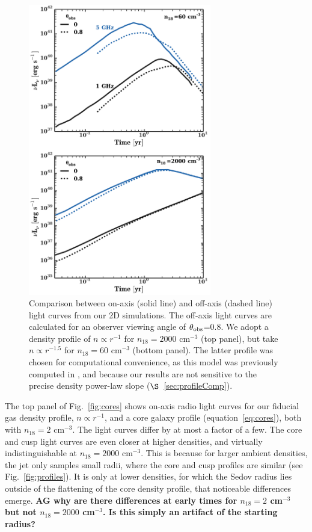 \documentclass[usenatbib,fleqn]{mnras}
\begin{document}
\begin{figure}
\includegraphics[width=8cm]{on_off.pdf}
\caption{\label{fig:onOff} Comparison between on-axis (solid line) and
  off-axis (dashed line) light curves from our 2D simulations.  The
  off-axis light curves are calculated for an observer viewing angle
  of $\theta_{\rm obs}$=0.8.  We adopt a density profile of $n\propto
  r^{-1}$ for $n_{18}=2000$ cm$^{-3}$ (top panel), but take $n\propto
  r^{-1.5}$ for $n_{18}=60$ cm$^{-3}$ (bottom panel).  The latter
  profile was chosen for computational convenience, as this model was
  previously computed in \citet{Mimica+2015}, and because our results
  are not sensitive to the precise density power-law slope
  ($\S$~\ref{sec:profileComp}).}
\end{figure}

\label{sec:profileComp}
The top panel of Fig.~\ref{fig:cores} shows on-axis radio light curves
for our fiducial gas density profile, $n\propto r^{-1}$, and a core
galaxy profile (equation~\ref{eq:cores}), both with $n_{18}=2$
cm$^{-3}$.  The light curves differ by at most a factor of a few. The
core and cusp light curves are even closer at higher densities, and
virtually indistinguishable at $n_{18}=2000$ cm$^{-3}$. This is
because for larger ambient densities, the jet only samples small
radii, where the core and cusp profiles are similar (see
Fig.~\ref{fig:profiles}). It is only at lower densities, for which the
Sedov radius lies outside of the flattening of the core density
profile, that noticeable differences emerge.  {\bf AG why are there
  differences at early times for $n_{18}=2$ cm$^{-3}$ but not
  $n_{18}=2000$ cm$^{-3}$. Is this simply an artifact of the starting
  radius?}  
\end{document}
